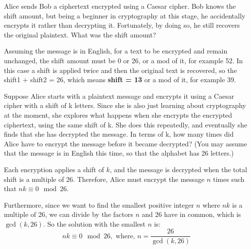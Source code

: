 \documentclass{my-cls}
\begin{document}
\begin{problem}[1.4]
Alice sends Bob a ciphertext encrypted using a Caesar cipher. Bob knows the shift amount, but being a beginner in cryptography at this stage, he accidentally encrypts it rather than decrypting it. Fortunately, by doing so, he still recovers the original plaintext. What was the shift amount?
\end{problem}

\begin{solution}[1.4]
Assuming the message is in English, for a text to be encrypted and remain unchanged, the shift amount must be 0 or 26, or a mod of it, for example 52. In this case a shift is applied twice and then the original text is recovered, so the shift1 + shift2 = 26, which means \textbf{shift = 13} or a mod of it, for example 39.
\end{solution}

\begin{problem}[1.6]
Suppose Alice starts with a plaintext message and encrypts it using a Caesar cipher with a shift of k letters. Since she is also just learning about cryptography at the moment, she explores what happens when she encrypts the encrypted ciphertext, using the same shift of k. She does this repeatedly, and eventually she finds that she has decrypted the message. In terms of k, how many times did Alice have to encrypt the message before it became decrypted? (You may assume that the message is in English this time, so that the alphabet has 26 letters.)
\end{problem}

\begin{solution}[1.6]
Each encryption applies a shift of \(k\), and the message is decrypted when the total shift is a multiple of 26. Therefore, Alice must encrypt the message \(n\) times such that \(nk \equiv 0 \mod 26\).

\smallskip

Furthermore, since we want to find the smallest positive integer \(n\) where \(nk\) is a multiple of 26, we can divide by the factors \(n\) and 26 have in common, which is \(\gcd(k, 26)\). So the solution with the smallest \(n\) is:
\[nk \equiv 0 \mod 26, \text{ where, } n = \frac{26}{\gcd(k, 26)}\]
\end{solution}

\end{document}
